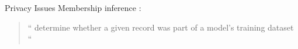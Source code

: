 \documentclass[17pt,aspectratio=169]{beamer}
\begin{document}
\begin{frame}[t]{Privacy Issues}
  Membership inference :
  \begin{minipage}{0.5\linewidth}
    \vspace{1em}
    \begin{center}
      \addtolength{\leftmargini}{-1em}
      \begin{quote}
      `` \small determine whether a given record was part of a model’s
      training dataset \normalsize ``
      \end{quote}
    \end{center}
    \vspace{1.5em}
  \end{minipage}~~%
  \begin{minipage}{0.45\linewidth}
    \vspace{-2em}
    \begin{center}\pause
      \begin{overlayarea}{\textwidth}{5cm}
      \end{overlayarea}
    \end{center}
  \end{minipage}

\end{frame}
\end{document}
